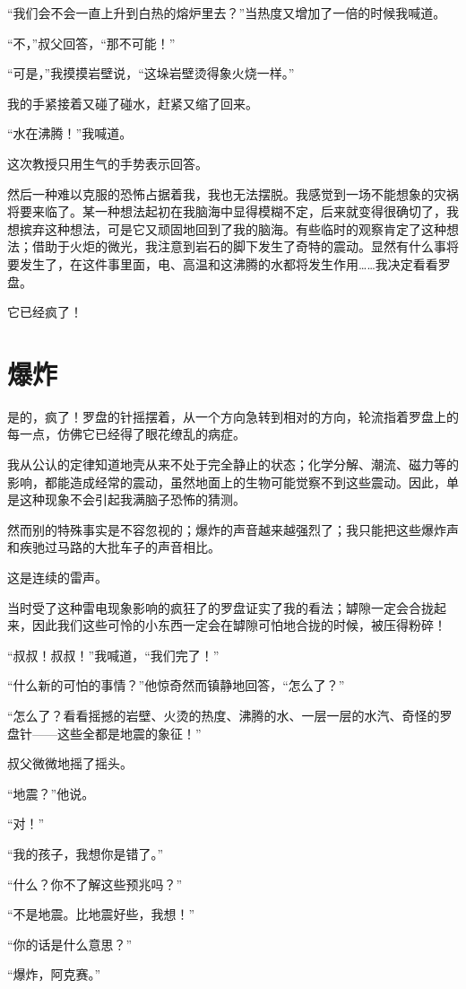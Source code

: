 \documentclass[10pt]{book}
\begin{document}
“我们会不会一直上升到白热的熔炉里去？”当热度又增加了一倍的时候我喊道。

“不，”叔父回答，“那不可能！”

“可是，”我摸摸岩壁说，“这垛岩壁烫得象火烧一样。”

我的手紧接着又碰了碰水，赶紧又缩了回来。

“水在沸腾！”我喊道。

这次教授只用生气的手势表示回答。

然后一种难以克服的恐怖占据着我，我也无法摆脱。我感觉到一场不能想象的灾祸将要来临了。某一种想法起初在我脑海中显得模糊不定，后来就变得很确切了，我想摈弃这种想法，可是它又顽固地回到了我的脑海。有些临时的观察肯定了这种想法；借助于火炬的微光，我注意到岩石的脚下发生了奇特的震动。显然有什么事将要发生了，在这件事里面，电、高温和这沸腾的水都将发生作用……我决定看看罗盘。

它已经疯了！
\chapter{爆炸}
是的，疯了！罗盘的针摇摆着，从一个方向急转到相对的方向，轮流指着罗盘上的每一点，仿佛它已经得了眼花缭乱的病症。

我从公认的定律知道地壳从来不处于完全静止的状态；化学分解、潮流、磁力等的影响，都能造成经常的震动，虽然地面上的生物可能觉察不到这些震动。因此，单是这种现象不会引起我满脑子恐怖的猜测。

然而别的特殊事实是不容忽视的；爆炸的声音越来越强烈了；我只能把这些爆炸声和疾驰过马路的大批车子的声音相比。

这是连续的雷声。

当时受了这种雷电现象影响的疯狂了的罗盘证实了我的看法；罅隙一定会合拢起来，因此我们这些可怜的小东西一定会在罅隙可怕地合拢的时候，被压得粉碎！

“叔叔！叔叔！”我喊道，“我们完了！”

“什么新的可怕的事情？”他惊奇然而镇静地回答，“怎么了？”

“怎么了？看看摇撼的岩壁、火烫的热度、沸腾的水、一层一层的水汽、奇怪的罗盘针——这些全都是地震的象征！”

叔父微微地摇了摇头。

“地震？”他说。

“对！”

“我的孩子，我想你是错了。”

“什么？你不了解这些预兆吗？”

“不是地震。比地震好些，我想！”

“你的话是什么意思？”

“爆炸，阿克赛。”
\end{document}
